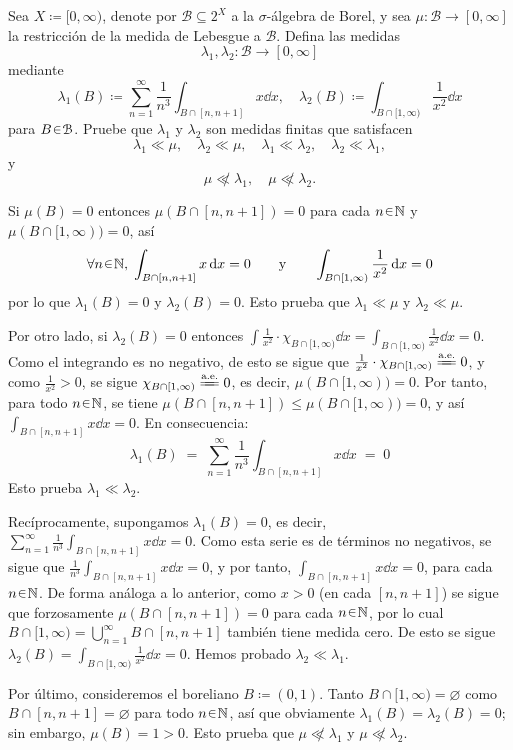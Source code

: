 \setcounter{neje}{32}
\begin{nejer}
Sea $X \coloneq [0, \infty)$, denote por $\mathcal{B} \subseteq 2^X$ a la $\sigma$-álgebra de Borel, y sea $\mu \colon \mathcal{B} \to [0, \infty]$ la restricción de la medida de Lebesgue a $\mathcal{B}$. Defina las medidas
$$
\lambda_1, \lambda_2 \colon \mathcal{B} \to [0, \infty]
$$
mediante
$$
\lambda_1(B) \coloneq \sum_{n=1}^\infty \frac{1}{n^3} \int_{B \cap [n, n+1]} x \dd{x}, \quad \lambda_2(B) \coloneq \int_{B \cap [1, \infty)} \frac{1}{x^2} \dd{x}
$$
para $B \en \mathcal{B}$.
Pruebe que $\lambda_1$ y $\lambda_2$ son medidas finitas que satisfacen
$$
\lambda_1 \ll \mu, \quad \lambda_2 \ll \mu, \quad \lambda_1 \ll \lambda_2, \quad \lambda_2 \ll \lambda_1,
$$
y
$$
\mu \not\ll \lambda_1, \quad \mu \not\ll \lambda_2.
$$
\end{nejer}
\begin{sol}
Si $\mu(B)=0$ entonces $\mu(B\cap[n,n+1]) = 0$ para cada $n\en\mathbb{N}$ y $\mu(B\cap[1,\infty)) = 0$, así
\[
\forall n\en\mathbb{N},\;
\int_{B \cap [n, n+1]} x \dd{x} = 0
\qquad\text{y}\qquad
\int_{B \cap [1, \infty)} \frac{1}{x^2} \dd{x} = 0
\]
por lo que $\lambda_1(B) = 0$ y $\lambda_2(B) = 0$. Esto prueba que $\lambda_1 \ll \mu$ y $\lambda_2 \ll \mu$.\par
Por otro lado, si $\lambda_2(B) = 0$ entonces $\int \frac{1}{x^2}\cdot\chi_{B \cap [1, \infty)} \dd{x}=\int_{B \cap [1, \infty)} \frac{1}{x^2} \dd{x} = 0$. Como el integrando es no negativo, de esto se sigue que $\frac{1}{x^2}\cdot\chi_{B \cap [1, \infty)} \ctpeq 0$, y como $\frac{1}{x^2} >0$, se sigue $\chi_{B \cap [1, \infty)} \ctpeq 0$, es decir, $\mu(B \cap [1, \infty)) = 0$. Por tanto, para todo $n\en\mathbb{N}$, se tiene $\mu(B \cap [n, n+1]) \leq \mu(B \cap [1, \infty)) = 0$, y así $\int_{B \cap [n, n+1]} x \dd{x} = 0$. En consecuencia: 
\[
\lambda_1(B) \;=\; \sum^\infty_{n=1}\frac{1}{n^3}\int_{B \cap [n, n+1]} x \dd{x} \;=\; 0
\]
Esto prueba $\lambda_1 \ll \lambda_2$.\par
Recíprocamente, supongamos $\lambda_1(B) = 0$, es decir, $\sum^\infty_{n=1}\frac{1}{n^3}\int_{B \cap [n, n+1]} x \dd{x} = 0$. Como esta serie es de términos no negativos, se sigue que $\frac{1}{n^3}\int_{B \cap [n, n+1]} x \dd{x} = 0$, y por tanto, $\int_{B \cap [n, n+1]} x \dd{x} = 0$, para cada $n\en\mathbb{N}$. De forma análoga a lo anterior, como $x>0$ (en cada $[n,n+1]$) se sigue que forzosamente $\mu(B\cap [n,n+1]) = 0$ para cada $n\en\mathbb{N}$, por lo cual $B\cap [1,\infty) = \bigcup^\infty_{n=1}B\cap [n,n+1]$ también tiene medida cero. De esto se sigue $\lambda_2(B) =\int_{B \cap [1, \infty)} \frac{1}{x^2} \dd{x} = 0$. Hemos probado $\lambda_2 \ll \lambda_1$.\par
Por último, consideremos el boreliano $B \coloneq (0,1)$. Tanto $B\cap[1,\infty) = \varnothing$ como $B\cap[n,n+1] = \varnothing$ para todo $n\en\mathbb{N}$, así que obviamente $\lambda_1(B) = \lambda_2(B) = 0$; sin embargo, $\mu(B) = 1 >0$. Esto prueba que $\mu \not\ll \lambda_1$ y $\mu \not\ll \lambda_2$.
\end{sol}